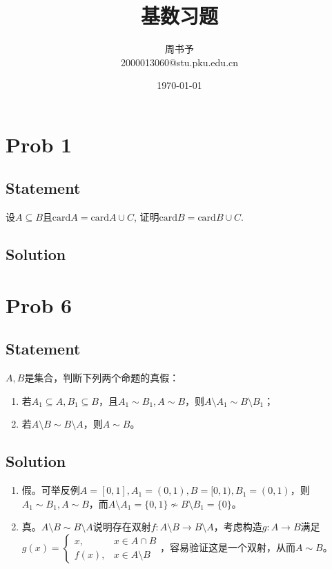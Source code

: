 \documentclass[UTF-8]{ctexart}
\title{\heiti\zihao{1}   基数习题}
\author{\kaishu\zihao{-3} 周书予\\2000013060@stu.pku.edu.cn}
\date{\today}
\def \card {\textrm{card}}
\begin{document}
\maketitle

{\color{blue}
\section{Prob 1}
\subsection{Statement}
设$A \subseteq B$且$\card A = \card A \cup C$, 证明$\card B = \card B \cup C$.
\subsection{Solution}
}

\section{Prob 6}
\subsection{Statement}
$A, B$是集合，判断下列两个命题的真假：
\begin{enumerate}
	\item 若$A_1 \subseteq A, B_1 \subseteq B$，且$A_1 \sim B_1, A \sim B$，则$A \setminus A_1 \sim B \setminus B_1$；
	\item 若$A \setminus B \sim B \setminus A$，则$A \sim B$。
\end{enumerate}
\subsection{Solution}
\begin{enumerate}
	\item 假。可举反例$A = [0, 1], A_1 = (0, 1), B = [0, 1), B_1 = (0, 1)$，则$A_1 \sim B_1, A \sim B$，而$A \setminus A_1 = \{0, 1\} \nsim B \setminus B_1 = \{0\}$。
	\item 真。$A \setminus B \sim B \setminus A$说明存在双射$f: A\setminus B \to B \setminus A$，考虑构造$g: A \to B$满足$g(x) = \begin{cases}
	x, & x \in A \cap B\\f(x), & x \in A \setminus B
	\end{cases}$，容易验证这是一个双射，从而$A \sim B$。
\end{enumerate}
\end{document}
